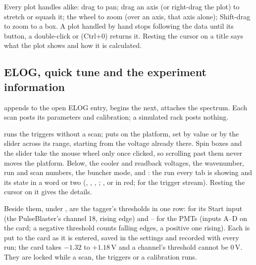Every plot handles alike: drag to pan; drag an axis (or right-drag the plot) to stretch or
squash it; the wheel to zoom (over an axis, that axis alone); Shift-drag to zoom to a box. A plot handled by hand stops following
the data until its \raisebox{-0.1ex}{$\circlearrowleft$} button, a double-click or
 (Ctrl+0) returns it. Resting the cursor on a title says
what the plot shows and how it is calculated.

\subsection{ELOG, quick tune and the experiment information}

 appends to the open ELOG entry,  begins the
next,  attaches the spectrum. Each scan posts its parameters and
calibration; a simulated rack posts nothing.

 runs the triggers without a scan;  puts
 on the platform, set by value or by the slider across its range, starting
from the voltage already there. Spin boxes and the slider take the mouse wheel only once
clicked, so scrolling past them never moves the platform. Below, the cooler and readback
voltages, the wavenumber, run and scan numbers, the buncher mode, and : the run
every tab is showing and its state in a word or two (, ,
, ; ,  or 
in red;  for the trigger stream). Resting the cursor on it gives the
details.

Beside them, under , are the tagger's thresholds in one row:
 for its Start input (the PulseBlaster's channel 18, rising edge) and
-- for the PMTs (inputs A--D on the card; a negative threshold
counts falling edges, a positive one rising). Each is
put to the card as it is entered, saved in the settings and recorded with every run; the
card takes $-1.32$ to $+1.18$\,V and a channel's threshold cannot be 0\,V. They are locked
while a scan, the triggers or a calibration runs.
